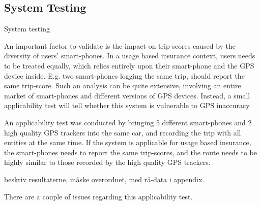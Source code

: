 \subsection{System Testing}\label{subsec:systemtesting}

System testing

An important factor to validate is the impact on trip-scores caused by the diversity of users' smart-phones. In a usage based insurance context, users needs to be treated equally, which relies entirely upon their smart-phone and the GPS device inside. E.g. two smart-phones logging the same trip, should report the same trip-score. Such an analysis can be quite extensive, involving an entire market of smart-phones and different versions of GPS devices. Instead, a small applicability test will tell whether this system is vulnerable to GPS inaccuracy. 

An applicability test was conducted by bringing 5 different smart-phones and 2 high quality GPS trackers into the same car, and recording the trip with all entities at the same time. If the system is applicable for usage based insurance, the smart-phones needs to report the same trip-scores, and the route needs to be highly similar to those recorded by the high quality GPS trackers. 

beskriv resultaterne, måske overordnet, med rå-data i appendix.

There are a couple of issues regarding this applicability test. 


